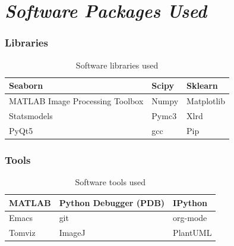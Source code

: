 \documentclass[11pt]{report}
\begin{document}
\appendix
\chapter{\emph{Software Packages Used}}
\label{sec:org7458110}
\subsection{Libraries}
\label{sec:org4df79c1}
\begin{table}[htbp]
\caption{\label{tab:orgfeb396f}
Software libraries used}
\centering
\begin{tabularx}{\textwidth}{|X|X|X|}
\hline
Seaborn & Scipy & Sklearn\\
\hline
MATLAB Image Processing Toolbox & Numpy & Matplotlib\\
\hline
Statsmodels & Pymc3 & Xlrd\\
\hline
PyQt5 & gcc & Pip\\
\hline
\end{tabularx}
\end{table}

\subsection{Tools}
\label{sec:orge7bf5f2}
\begin{table}[htbp]
\caption{\label{tab:org33bf8e0}
Software tools used}
\centering
\begin{tabularx}{\textwidth}{|X|X|X|}
\hline
MATLAB & Python Debugger (PDB) & IPython\\
\hline
Emacs & git & org-mode\\
\hline
Tomviz & ImageJ & PlantUML\\
\hline
\end{tabularx}
\end{table}

\clearpage
\end{document}
